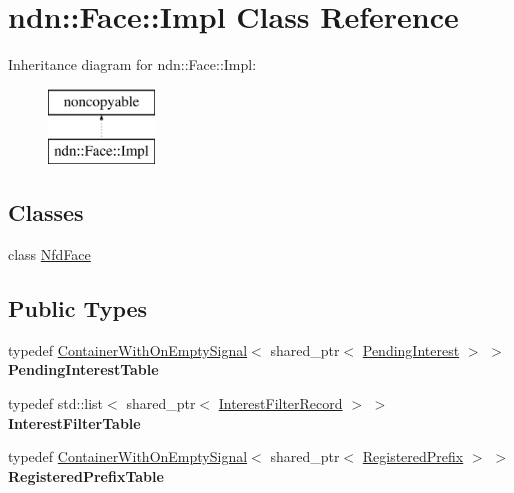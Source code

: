 \hypertarget{classndn_1_1Face_1_1Impl}{}\section{ndn\+:\+:Face\+:\+:Impl Class Reference}
\label{classndn_1_1Face_1_1Impl}
Inheritance diagram for ndn\+:\+:Face\+:\+:Impl\+:\begin{figure}[H]
\begin{center}
\leavevmode
\includegraphics[height=2.000000cm]{classndn_1_1Face_1_1Impl}
\end{center}
\end{figure}
\subsection*{Classes}
\begin{DoxyCompactItemize}
\item 
class \hyperlink{classndn_1_1Face_1_1Impl_1_1NfdFace}{Nfd\+Face}
\end{DoxyCompactItemize}
\subsection*{Public Types}
\begin{DoxyCompactItemize}
\item 
typedef \hyperlink{classndn_1_1ContainerWithOnEmptySignal}{Container\+With\+On\+Empty\+Signal}$<$ shared\+\_\+ptr$<$ \hyperlink{classndn_1_1PendingInterest}{Pending\+Interest} $>$ $>$ {\bfseries Pending\+Interest\+Table}\hypertarget{classndn_1_1Face_1_1Impl_afca4744562c5c08cd1e922f930380c7d}{}\label{classndn_1_1Face_1_1Impl_afca4744562c5c08cd1e922f930380c7d}

\item 
typedef std\+::list$<$ shared\+\_\+ptr$<$ \hyperlink{classndn_1_1InterestFilterRecord}{Interest\+Filter\+Record} $>$ $>$ {\bfseries Interest\+Filter\+Table}\hypertarget{classndn_1_1Face_1_1Impl_ae422106b408ec7d585d0c8385f604178}{}\label{classndn_1_1Face_1_1Impl_ae422106b408ec7d585d0c8385f604178}

\item 
typedef \hyperlink{classndn_1_1ContainerWithOnEmptySignal}{Container\+With\+On\+Empty\+Signal}$<$ shared\+\_\+ptr$<$ \hyperlink{classndn_1_1RegisteredPrefix}{Registered\+Prefix} $>$ $>$ {\bfseries Registered\+Prefix\+Table}\hypertarget{classndn_1_1Face_1_1Impl_a144af8dadc51ab3b75aac06ddd495352}{}\label{classndn_1_1Face_1_1Impl_a144af8dadc51ab3b75aac06ddd495352}

\end{DoxyCompactItemize}

